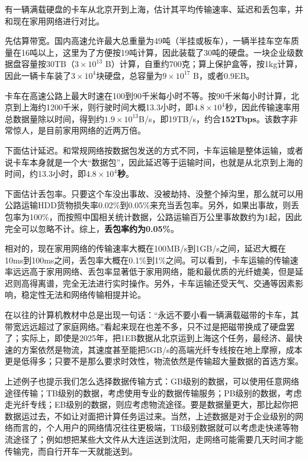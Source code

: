\documentclass[../main.tex]{subfiles}
\begin{document}
\begin{example}
  有一辆满载硬盘的卡车从北京开到上海，估计其平均传输速率、延迟和丢包率，并和现在家用网络进行对比。
\end{example}

\begin{answer}
  先估算带宽。国内高速允许最大总重量为49吨（半挂或板车），一辆半挂车空车质量在16吨以上，这里为了方便按19吨计算，因此装载了30吨的硬盘。一块企业级数据盘容量按30TB（$3\times 10^{13}$ B）计算，自重约700克；算上保护盒等，按1kg计算，因此一辆卡车装了$3\times 10^4$块硬盘，总容量为$9\times 10^{17}$ B，或者0.9EB。

  卡车在高速公路上最大时速在100到90千米每小时不等。按90千米每小时计算，北京到上海约1200千米，则行驶时间大概13.3小时，即$4.8\times 10^4$秒，因此传输速率用总数据量除以时间，得到约$1.9\times 10^{13}$B/s，即19TB/s，约合\textbf{152Tbps}。该数字非常惊人，是目前家用网络的近两万倍。

  下面估计延迟。和常规网络按数据包发送的方式不同，卡车运输是整体运输，或者说卡车本身就是一个大“数据包”，因此延迟等于运输时间，也就是从北京到上海的时间，约13.3小时，即\textbf{$4.8\times 10^4$秒}。

  下面估计丢包率。只要这个车没出事故、没被劫持、没整个掉沟里，那么就可以用公路运输HDD货物损失率0.02\%到0.05\%来充当丢包率。另外，如果出事故，则丢包率为100\%，而按照中国相关统计数据，公路运输百万公里事故数约为1起，因此完全可以忽略不计。综上，\textbf{丢包率约为0.05\%}。

  相对的，现在家用网络的传输速率大概在100MB/s到1GB/s之间，延迟大概在10ms到100ms之间，丢包率大概在0.1\%到1\%之间。可以看到，卡车运输的传输速率远远高于家用网络、丢包率显著低于家用网络，能和最优质的光纤媲美，但是延迟则高得离谱，完全无法进行实时操作。另外，卡车运输还受天气、交通等因素影响，稳定性无法和网络传输相提并论。
\end{answer}

在以往的计算机教材中总是出现一句话：“永远不要小看一辆满载磁带的卡车，其带宽远远超过了家庭网络。”看起来现在也差不多，只不过是把磁带换成了硬盘罢了；实际上，即使是2025年，把1EB数据从北京运到上海这个任务，最经济、最快速的方案依然是物流，其速度甚至能把5GB/s的高端光纤专线按在地上摩擦，成本更是低得多；只要不是那么要求时效性，物流依然是传输超大量数据的首选方案。

上述例子也提示我们怎么选择数据传输方式：GB级别的数据，可以使用任意网络途径传输；TB级别的数据，考虑使用专业的数据传输服务；PB级别的数据，考虑走光纤专线；EB级别的数据，则应考虑物流途径。要是数据量更大，那比起你把数据运过去，不如让对面把计算任务运过来。当然，上述数据是对于企业级别的网络而言的，个人用户的网络情况往往更极端，TB级别数据就可以考虑走快递等物流途径了；例如想把某些大文件从大连运送到沈阳，走网络可能需要几天时间才能传输完，而自行开车一天就能送到。
\end{document}
